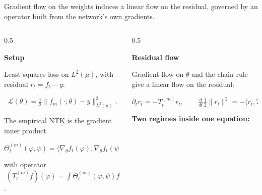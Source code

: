 \documentclass[aspectratio=169,9pt]{beamer}
\begin{document}
\begin{frame}[noframenumbering]
	{\textcolor{muted}{Gradient flow on the weights induces a linear flow on the residual, governed by an operator built from the network's own gradients.}}

	\vspace{1.5mm}
	\begin{columns}[T,onlytextwidth]
		\begin{column}{0.5\textwidth}
			\begin{whitecard}[height=44mm]
				{\scriptsize\bfseries Setup}\par\vspace{1mm}
				{\scriptsize Least-squares loss on $L^2(\mu)$, with residual $r_t=f_t-y$:}\par\vspace{-1.5mm}
				{\scriptsize
				\[
					\mathcal L(\theta)=\tfrac12\|f_m(\cdot;\theta)-y\|_{L^2(\mu)}^2 .
				\]
				}
				\vspace{-3mm}\par
				{\scriptsize The empirical NTK is the gradient inner product}\par\vspace{-1.5mm}
				{\scriptsize
					\[
						\Theta_t^{(m)}(\varphi,\psi)=\bigl\langle\nabla_\theta f_t(\varphi),\nabla_\theta f_t(\psi)\bigr\rangle,
					\]
				}
				\vspace{-3mm}\par
				{\scriptsize with operator $\;(T_t^{(m)}f)(\varphi)=\int \Theta_t^{(m)}(\varphi,\psi)f(\psi)\,d\mu(\psi)$.}
			\end{whitecard}
		\end{column}
		\begin{column}{0.5\textwidth}
			\begin{bluecard}[height=44mm]
				{\scriptsize\bfseries Residual flow}\par\vspace{1mm}
				{\scriptsize Gradient flow on $\theta$ and the chain rule give a linear flow on the residual:}\par\vspace{-1mm}
				{\scriptsize
				\[
					\partial_t r_t=-T_t^{(m)}r_t,
					\qquad
					\tfrac{d}{dt}\tfrac12\|r_t\|^2=-\langle r_t,T_t^{(m)}r_t\rangle .
				\]
				}
				\vspace{-2mm}\par
				{\scriptsize\bfseries Two regimes inside one equation:}

\end{bluecard}
\end{column}
\end{columns}
\end{frame}
\end{document}
